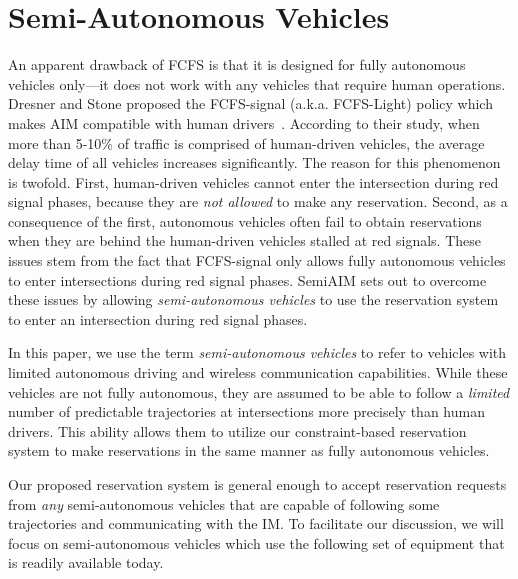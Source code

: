 \section{Semi-Autonomous Vehicles}
\label{sec:vehicles}

An apparent drawback of FCFS is that it is designed for fully autonomous
vehicles only---it does not work with any vehicles that require human
operations.
Dresner and Stone proposed the FCFS-signal (a.k.a. FCFS-Light) policy which makes AIM
compatible with human drivers~\cite{bib:Dresner07Sharing}. According
to their study, when more than 5-10\% of traffic is comprised of
human-driven vehicles, the average delay time of all vehicles
increases significantly.  The reason for this phenomenon is twofold.
First, human-driven vehicles cannot enter the intersection during red
signal phases, because they are \emph{not allowed} to make any
reservation.  Second, as a consequence of the first, autonomous
vehicles often fail to obtain reservations when they are
behind the human-driven vehicles stalled at red signals.  These issues
stem from the fact that FCFS-signal only allows fully autonomous
vehicles to enter intersections during red signal phases.
SemiAIM sets out to overcome these issues by allowing
\emph{semi-autonomous vehicles} to use the reservation system
to enter an intersection during red signal phases.

In this paper, we use the term \emph{semi-autonomous vehicles} to
refer to vehicles with limited autonomous driving and wireless
communication capabilities.  While these vehicles are not fully
autonomous, they are assumed to be able to follow a \emph{limited}
number of predictable trajectories at intersections more precisely
than human drivers.  This ability allows them to utilize our
constraint-based reservation system to make reservations in the same
manner as fully autonomous vehicles.

Our proposed reservation system is general enough to accept
reservation requests from \emph{any} semi-autonomous vehicles that are
capable of following some trajectories and communicating with the IM.
To facilitate our discussion, we will focus on semi-autonomous
vehicles which use the following set of equipment that is readily
available today.

